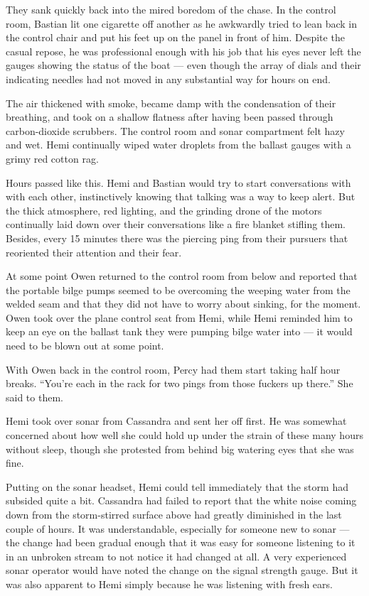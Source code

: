\documentclass[
]{scrbook}
\begin{document}
They sank quickly back into the mired boredom of the chase. In the
control room, Bastian lit one cigarette off another as he awkwardly
tried to lean back in the control chair and put his feet up on the panel
in front of him. Despite the casual repose, he was professional enough
with his job that his eyes never left the gauges showing the status of
the boat --- even though the array of dials and their indicating needles
had not moved in any substantial way for hours on end.

The air thickened with smoke, became damp with the condensation of their
breathing, and took on a shallow flatness after having been passed
through carbon-dioxide scrubbers. The control room and sonar compartment
felt hazy and wet. Hemi continually wiped water droplets from the
ballast gauges with a grimy red cotton rag.

Hours passed like this. Hemi and Bastian would try to start
conversations with with each other, instinctively knowing that talking
was a way to keep alert. But the thick atmosphere, red lighting, and the
grinding drone of the motors continually laid down over their
conversations like a fire blanket stifling them. Besides, every 15
minutes there was the piercing ping from their pursuers that reoriented
their attention and their fear.

At some point Owen returned to the control room from below and reported
that the portable bilge pumps seemed to be overcoming the weeping water
from the welded seam and that they did not have to worry about sinking,
for the moment. Owen took over the plane control seat from Hemi, while
Hemi reminded him to keep an eye on the ballast tank they were pumping
bilge water into --- it would need to be blown out at some point.

With Owen back in the control room, Percy had them start taking half
hour breaks. ``You're each in the rack for two pings from those fuckers
up there.'' She said to them.

Hemi took over sonar from Cassandra and sent her off first. He was
somewhat concerned about how well she could hold up under the strain of
these many hours without sleep, though she protested from behind big
watering eyes that she was fine.

Putting on the sonar headset, Hemi could tell immediately that the storm
had subsided quite a bit. Cassandra had failed to report that the white
noise coming down from the storm-stirred surface above had greatly
diminished in the last couple of hours. It was understandable,
especially for someone new to sonar --- the change had been gradual
enough that it was easy for someone listening to it in an unbroken
stream to not notice it had changed at all. A very experienced sonar
operator would have noted the change on the signal strength gauge. But
it was also apparent to Hemi simply because he was listening with fresh
ears.
\end{document}
